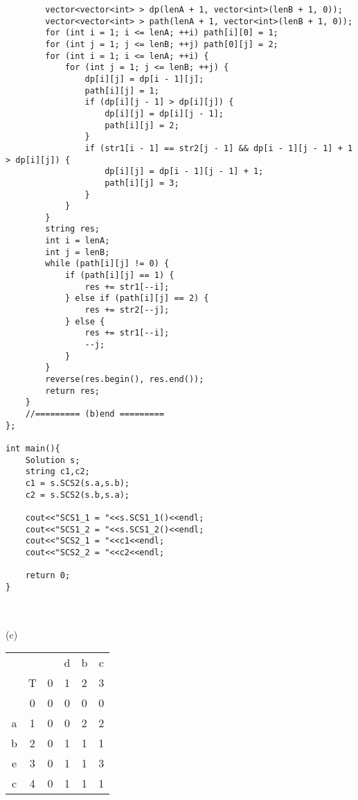 \documentclass[fleqn]{article}
\begin{document}
\begin{lstlisting}
        vector<vector<int> > dp(lenA + 1, vector<int>(lenB + 1, 0));
        vector<vector<int> > path(lenA + 1, vector<int>(lenB + 1, 0));
        for (int i = 1; i <= lenA; ++i) path[i][0] = 1;
        for (int j = 1; j <= lenB; ++j) path[0][j] = 2;
        for (int i = 1; i <= lenA; ++i) {
            for (int j = 1; j <= lenB; ++j) {
                dp[i][j] = dp[i - 1][j];
                path[i][j] = 1;
                if (dp[i][j - 1] > dp[i][j]) {
                    dp[i][j] = dp[i][j - 1];
                    path[i][j] = 2;
                }
                if (str1[i - 1] == str2[j - 1] && dp[i - 1][j - 1] + 1 > dp[i][j]) {
                    dp[i][j] = dp[i - 1][j - 1] + 1;
                    path[i][j] = 3;
                }
            }
        }
        string res;
        int i = lenA;
        int j = lenB;
        while (path[i][j] != 0) {
            if (path[i][j] == 1) {
                res += str1[--i];
            } else if (path[i][j] == 2) {
                res += str2[--j];
            } else {
                res += str1[--i];
                --j;
            }
        }
        reverse(res.begin(), res.end());
        return res;
    }
    //========= (b)end =========
};

int main(){
    Solution s;
    string c1,c2;
    c1 = s.SCS2(s.a,s.b);
    c2 = s.SCS2(s.b,s.a);

    cout<<"SCS1_1 = "<<s.SCS1_1()<<endl;
    cout<<"SCS1_2 = "<<s.SCS1_2()<<endl;
    cout<<"SCS2_1 = "<<c1<<endl;
    cout<<"SCS2_2 = "<<c2<<endl;
    
    return 0;
}
    
\end{lstlisting}
\
\\
(c)

\begin{tabular}{|c|c|c|c|c|c|}
    \hline
    & &  & d & b & c \\
    & T & 0 & 1 & 2 & 3 \\
    \hline
     & 0 & 0 & 0 & 0 & 0 \\
    \hline
    a & 1 & 0 & 0 & 2 & 2 \\
    \hline
    b & 2 & 0 & 1 & 1 & 1 \\
    \hline
    e & 3 & 0 & 1 & 1 & 3 \\
    \hline
    c & 4 & 0 & 1 & 1 & 1 \\
    \hline
\end{tabular}
\end{document}

